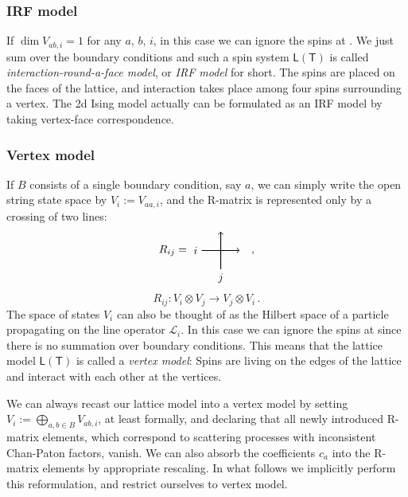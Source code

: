 \subsubsection*{IRF model}

If $\dim V_{ab,i}=1$ for any $a,\,b,\,i$, in this case we can ignore
the spins at . We just sum over the boundary conditions
and such a spin system $\mathsf{L}\left(\mathsf{T}\right)$ is called
\emph{interaction-round-a-face model}, or \emph{IRF model} for short.
The spins are placed on the faces of the lattice, and interaction
takes place among four spins surrounding a vertex. The 2d Ising model
actually can be formulated as an IRF model by taking vertex-face correspondence. 


\subsubsection*{Vertex model}

If $B$ consists of a single boundary condition, say $a$, we can
simply write the open string state space by $V_{i}:=V_{aa,i}$, and
the R-matrix is represented only by a crossing of two lines: 
\begin{equation}
  R_{ij}
  =
    \begin{tikzpicture}[scale=0.6, baseline=(x.base)]
        \node (x) at (0,0) {\vphantom{x}};
        
        \draw[thick, ->] (0,0) node[left] {$i$} -- (2,0);
        \draw[thick, ->] (1,-1) node[below] {$j$} -- (1,1);
        
    \end{tikzpicture}
  \quad ,
\end{equation}
\begin{equation}
  R_{ij}  :  V_{i}\otimes V_{j}  \longrightarrow  V_{j}\otimes V_{i} \, .
\end{equation}
The space of states $V_{i}$ can also be thought of as the Hilbert
space of a particle propagating on the line operator $\mathcal{L}_{i}$.
In this case we can ignore the spins at  since there
is no summation over boundary conditions. This means that the lattice
model $\mathsf{L}\left(\mathsf{T}\right)$ is called a \emph{vertex
model}: Spins are living on the edges of the lattice and interact
with each other at the vertices. 

We can always recast our lattice model into a vertex model by setting
$V_{i}:=\bigoplus_{a,b\in B}V_{ab,i}$, at least formally, and declaring
that all newly introduced R-matrix elements, which correspond to scattering
processes with inconsistent Chan-Paton factors, vanish. We can also
absorb the coefficients $c_{a}$ into the R-matrix elements by appropriate
rescaling. In what follows we implicitly perform this reformulation,
and restrict ourselves to vertex model.

